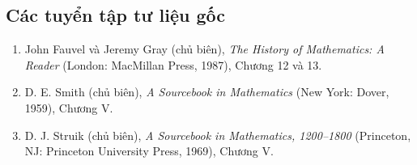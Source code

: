\documentclass[12pt,a4paper]{article}
\begin{document}
\subsection*{Các tuyển tập tư liệu gốc}
\begin{enumerate}[leftmargin=1.8em]
\item John Fauvel và Jeremy Gray (chủ biên), \textit{The History of Mathematics: A Reader} (London: MacMillan Press, 1987), Chương 12 và 13.
\item D. E. Smith (chủ biên), \textit{A Sourcebook in Mathematics} (New York: Dover, 1959), Chương V.
\item D. J. Struik (chủ biên), \textit{A Sourcebook in Mathematics, 1200–1800} (Princeton, NJ: Princeton University Press, 1969), Chương V.
\end{enumerate}
\end{document}
